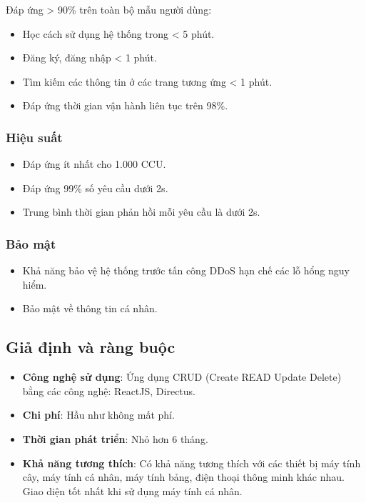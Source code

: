 \documentclass[./../main.tex]{subfiles}
\begin{document}
Đáp ứng > 90\% trên toàn bộ mẫu người dùng:
\begin{itemize}
    \item Học cách sử dụng hệ thống trong < 5 phút.
    \item Đăng ký, đăng nhập < 1 phút.
    \item Tìm kiếm các thông tin ở các trang tương ứng < 1 phút.
    \item Đáp ứng thời gian vận hành liên tục trên 98\%.
\end{itemize}

\subsubsection{Hiệu suất}
\begin{itemize}
	\item Đáp ứng ít nhất cho 1.000 CCU.
	\item Đáp ứng 99\% số yêu cầu dưới 2s.
	\item Trung bình thời gian phản hồi mỗi yêu cầu là dưới 2s.
\end{itemize}

\subsubsection{Bảo mật}
\begin{itemize}
	\item Khả năng bảo vệ hệ thống trước tấn công DDoS hạn chế các lỗ hổng nguy hiểm.
	\item Bảo mật về thông tin cá nhân.
\end{itemize}

\subsection{Giả định và ràng buộc}
\begin{itemize}
    \item \textbf{Công nghệ sử dụng}: Ứng dụng CRUD (Create READ Update Delete) bằng các công nghệ: ReactJS, Directus.
    \item \textbf{Chi phí}: Hầu như không mất phí.
    \item \textbf{Thời gian phát triển}: Nhỏ hơn 6 tháng.
    \item \textbf{Khả năng tương thích}: Có khả năng tương thích với các thiết bị máy tính cây, máy tính cá nhân, máy tính bảng, điện thoại thông minh khác nhau. Giao diện tốt nhất khi sử dụng máy tính cá nhân.
\end{itemize}
\end{document}
